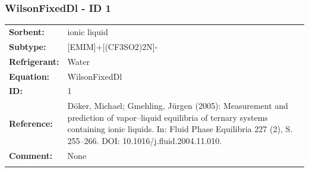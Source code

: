\subsubsection{WilsonFixedDl - ID 1}
%
\begin{tabular}[l]{|lp{11.5cm}|}
\hline
\addlinespace

\textbf{Sorbent:} & ionic liquid \\
\textbf{Subtype:} & [EMIM]+[(CF3SO2)2N]- \\
\textbf{Refrigerant:} & Water \\
\textbf{Equation:} & WilsonFixedDl \\
\textbf{ID:} & 1 \\
\textbf{Reference:} & Döker, Michael; Gmehling, Jürgen (2005): Measurement and prediction of vapor–liquid equilibria of ternary systems containing ionic liquids. In: Fluid Phase Equilibria 227 (2), S. 255–266. DOI: 10.1016/j.fluid.2004.11.010. \\
\textbf{Comment:} & None \\

\addlinespace
\hline
\end{tabular}
\newline

